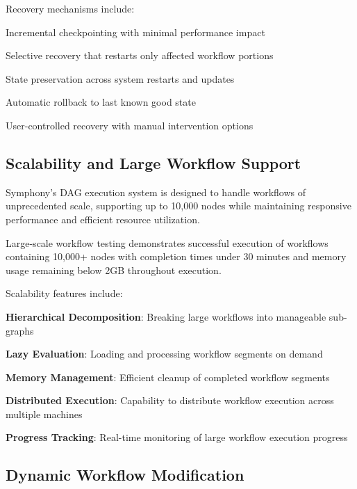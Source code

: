 Recovery mechanisms include:

\begin{compactlist}
    \item Incremental checkpointing with minimal performance impact
    \item Selective recovery that restarts only affected workflow portions
    \item State preservation across system restarts and updates
    \item Automatic rollback to last known good state
    \item User-controlled recovery with manual intervention options
\end{compactlist}

\subsection*{Scalability and Large Workflow Support}

Symphony's DAG execution system is designed to handle workflows of unprecedented scale, supporting up to 10,000 nodes while maintaining responsive performance and efficient resource utilization.

\begin{successbox}
Large-scale workflow testing demonstrates successful execution of workflows containing 10,000+ nodes with completion times under 30 minutes and memory usage remaining below 2GB throughout execution.
\end{successbox}

Scalability features include:

\begin{expandedlist}
    \item \textbf{Hierarchical Decomposition}: Breaking large workflows into manageable sub-graphs
    \item \textbf{Lazy Evaluation}: Loading and processing workflow segments on demand
    \item \textbf{Memory Management}: Efficient cleanup of completed workflow segments
    \item \textbf{Distributed Execution}: Capability to distribute workflow execution across multiple machines
    \item \textbf{Progress Tracking}: Real-time monitoring of large workflow execution progress
\end{expandedlist}

\subsection*{Dynamic Workflow Modification}

